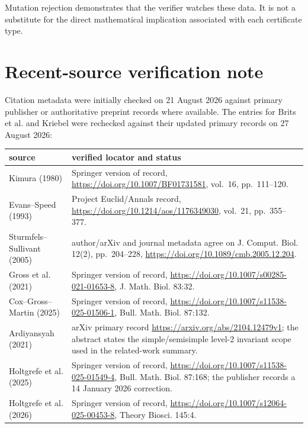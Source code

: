 \documentclass[11pt]{article}
\theoremstyle{remark}
\begin{document}
Mutation rejection demonstrates that the verifier watches these data.  It is
not a substitute for the direct mathematical implication associated with each
certificate type.

\section{Recent-source verification note}\label{sec:citations}

Citation metadata were initially checked on 21 August 2026 against primary
publisher or authoritative preprint records where available.  The entries for
Brits et al. and Kriebel were rechecked against their updated primary records
on 27 August 2026:
\begin{center}
\small
\begin{tabular}{L{.27\linewidth}L{.63\linewidth}}
\toprule
source & verified locator and status\\
\midrule
Kimura (1980) \cite{Kimura1980}
& Springer version of record, \url{https://doi.org/10.1007/BF01731581},
vol.~16, pp.~111--120.\\
Evans--Speed (1993) \cite{EvansSpeed1993}
& Project Euclid/Annals record,
\url{https://doi.org/10.1214/aos/1176349030}, vol.~21, pp.~355--377.\\
Sturmfels--Sullivant (2005) \cite{SturmfelsSullivant2005}
& author/arXiv and journal metadata agree on J. Comput. Biol. 12(2),
pp.~204--228, \url{https://doi.org/10.1089/cmb.2005.12.204}.\\
Gross et al. (2021) \cite{GrossEtAl2021}
& Springer version of record,
\url{https://doi.org/10.1007/s00285-021-01653-8}, J. Math. Biol. 83:32.\\
Cox--Gross--Martin (2025) \cite{CoxGrossMartin2025}
& Springer version of record,
\url{https://doi.org/10.1007/s11538-025-01506-1}, Bull. Math. Biol. 87:132.\\
Ardiyansyah (2021) \cite{Ardiyansyah2021}
& arXiv primary record \url{https://arxiv.org/abs/2104.12479v1}; the abstract
states the simple/semisimple level-2 invariant scope used in the related-work
summary.\\
Holtgrefe et al. (2025) \cite{HoltgrefeEtAl2025Quartets}
& Springer version of record,
\url{https://doi.org/10.1007/s11538-025-01549-4}, Bull. Math. Biol. 87:168;
the publisher records a 14 January 2026 correction.\\
Holtgrefe et al. (2026) \cite{HoltgrefeEtAl2026}
& Springer version of record,
\url{https://doi.org/10.1007/s12064-025-00453-8}, Theory Biosci. 145:4.\\

\end{tabular}
\end{center}
\end{document}
